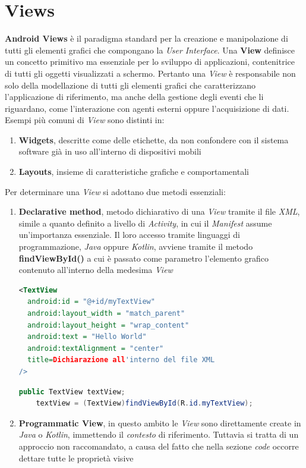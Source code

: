 \documentclass{article}
\begin{document}
\pagestyle{empty}

\section*{Views}
\large
\textbf{Android Views} è il paradigma standard per la creazione e manipolazione di tutti gli elementi grafici che compongano la \textit{User Interface}. Una \textbf{View} definisce un concetto primitivo ma essenziale per lo sviluppo di applicazioni, contenitrice di tutti gli oggetti visualizzati a schermo. Pertanto una \textit{View} è responsabile non solo della modellazione di tutti gli elementi grafici che caratterizzano l'applicazione di riferimento, ma anche della gestione degli eventi che li riguardano, come l'interazione con agenti esterni oppure l'acquisizione di dati.\vspace*{14pt}\\
Esempi più comuni di \textit{View} sono distinti in:
\begin{enumerate}
  \itemsep0em
  \renewcommand{\labelenumi}{-}
  \item \textbf{Widgets}, descritte come delle etichette, da non confondere con il sistema software già in uso all'interno di dispositivi mobili
  \item \textbf{Layouts}, insieme di caratteristiche grafiche e comportamentali    
\end{enumerate} 
Per determinare una \textit{View} si adottano due metodi essenziali:
\begin{enumerate}
  \itemsep0em
  \renewcommand{\labelenumi}{-}
  \item \textbf{Declarative method}, metodo dichiarativo di una \textit{View} tramite il file \textit{XML}, simile a quanto definito a livello di \textit{Activity}, in cui il \textit{Manifest} assume un'importanza essenziale. Il loro accesso tramite linguaggi di programmazione, \textit{Java} oppure \textit{Kotlin}, avviene tramite il metodo \textbf{findViewById()} a cui è passato come parametro l'elemento grafico contenuto all'interno della medesima \textit{View}\\
  \begin{lstlisting}[language=XML]
<TextView
  android:id = "@+id/myTextView"
  android:layout_width = "match_parent"
  android:layout_height = "wrap_content"
  android:text = "Hello World"
  android:textAlignment = "center"
  title=Dichiarazione all'interno del file XML
/>
  \end{lstlisting}
  \begin{lstlisting}[language=JAVA, title=Dichiarazione all'interno del file XML]
    public TextView textView;
    textView = (TextView)findViewById(R.id.myTextView);
  \end{lstlisting}
  \item \textbf{Programmatic View}, in questo ambito le \textit{View} sono direttamente create in \textit{Java} o \textit{Kotlin}, immettendo il \textit{contesto} di riferimento. Tuttavia si tratta di un approccio non raccomandato, a causa del fatto che nella sezione \textit{code} occorre dettare tutte le proprietà visive        
\end{enumerate} 
\end{document}
